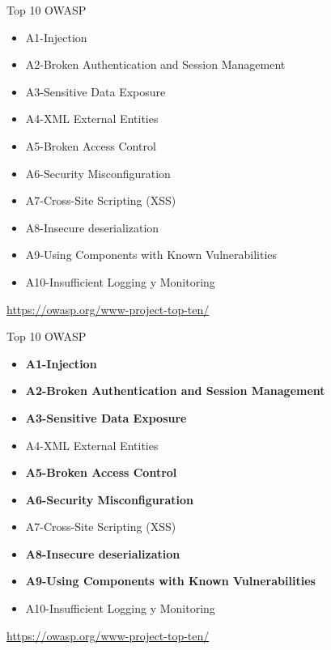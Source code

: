 \documentclass[aspectratio=169]{beamer}
\begin{document}
\begin{frame}{Top 10 OWASP}
    \begin{itemize}
        \item A1-Injection
        \item A2-Broken Authentication and Session Management
        \item A3-Sensitive Data Exposure
        \item A4-XML External Entities
        \item A5-Broken Access Control
        \item A6-Security Misconfiguration
        \item A7-Cross-Site Scripting (XSS)
        \item A8-Insecure deserialization
        \item A9-Using Components with Known Vulnerabilities
        \item A10-Insufficient Logging y Monitoring
    \end{itemize}
    \url{https://owasp.org/www-project-top-ten/}
\end{frame}

\begin{frame}{Top 10 OWASP}
    \begin{itemize}
        \item \textbf{A1-Injection}
        \item \textbf{A2-Broken Authentication and Session Management}
        \item \textbf{A3-Sensitive Data Exposure}
        \item A4-XML External Entities
        \item \textbf{A5-Broken Access Control}
        \item \textbf{A6-Security Misconfiguration}
        \item A7-Cross-Site Scripting (XSS)
        \item \textbf{A8-Insecure deserialization}
        \item \textbf{A9-Using Components with Known Vulnerabilities}
        \item A10-Insufficient Logging y Monitoring
    \end{itemize}
    \url{https://owasp.org/www-project-top-ten/}
\end{frame}
\end{document}
